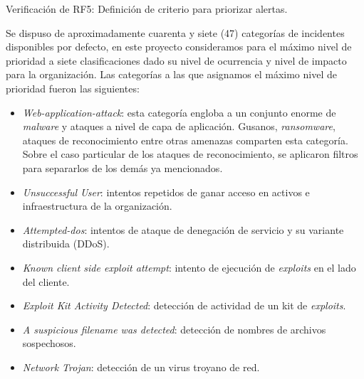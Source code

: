     \begin{section}{Verificación de RF5: Definición de criterio para priorizar alertas.}
    
    Se dispuso de aproximadamente cuarenta y siete (47) categorías de incidentes disponibles por defecto, en este proyecto consideramos para el máximo nivel de prioridad a siete clasificaciones dado su nivel de ocurrencia y nivel de impacto para la organización. Las categorías a las que asignamos el máximo nivel de prioridad fueron las siguientes:
    \begin{itemize}
    \item \textit{Web-application-attack}: esta categoría engloba a un conjunto enorme de \textit{malware} y ataques a nivel de capa de aplicación. Gusanos, \textit{ransomware}, ataques de reconocimiento entre otras amenazas comparten esta categoría. Sobre el caso particular de los ataques de reconocimiento, se aplicaron filtros para separarlos de los demás ya mencionados.
    \item \textit{Unsuccessful User}: intentos repetidos de ganar acceso en activos e infraestructura de la organización.
    \item \textit{Attempted-dos}: intentos de ataque de denegación de servicio y su variante distribuida (DDoS).
    \item \textit{Known client side exploit attempt}: intento de ejecución de \textit{exploits} en el lado del cliente.
    \item \textit{Exploit Kit Activity Detected}: detección de actividad de un kit de \textit{exploits}.
    \item \textit{A suspicious filename was detected}: detección de nombres de archivos sospechosos.
    \item \textit{Network Trojan}: detección de un virus troyano de red.
    \end{itemize}
    

\end{section}
